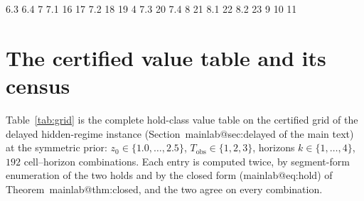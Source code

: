 \documentclass[11pt,a4paper]{article}
\makeatletter
\theoremstyle{plain}
\theoremstyle{definition}
\theoremstyle{remark}
\newcommand{\Tobs}{T_{\mathrm{obs}}}
\newcommand{\mref}[1]{\csname mainlab@#1\endcsname}
\newcommand{\meqref}[1]{(\mref{#1})}
\makeatother
\begin{document}
\expandafter\def\csname mainlab@ex:additive\endcsname{6.3}
\expandafter\def\csname mainlab@rem:delayedschedule\endcsname{6.4}
\expandafter\def\csname mainlab@sec:stochastic\endcsname{7}
\expandafter\def\csname mainlab@prop:pathdeficit\endcsname{7.1}
\expandafter\def\csname mainlab@eq:pathdeficit\endcsname{16}
\expandafter\def\csname mainlab@eq:sensor\endcsname{17}
\expandafter\def\csname mainlab@prop:noisyprobe\endcsname{7.2}
\expandafter\def\csname mainlab@eq:noisyprobe\endcsname{18}
\expandafter\def\csname mainlab@eq:majority3\endcsname{19}
\expandafter\def\csname mainlab@fig:probes\endcsname{4}
\expandafter\def\csname mainlab@prop:probecount\endcsname{7.3}
\expandafter\def\csname mainlab@eq:probecount\endcsname{20}
\expandafter\def\csname mainlab@rem:eps0\endcsname{7.4}
\expandafter\def\csname mainlab@sec:dr\endcsname{8}
\expandafter\def\csname mainlab@eq:rho\endcsname{21}
\expandafter\def\csname mainlab@prop:dr\endcsname{8.1}
\expandafter\def\csname mainlab@eq:contam\endcsname{22}
\expandafter\def\csname mainlab@prop:priorcontam\endcsname{8.2}
\expandafter\def\csname mainlab@eq:priorcontam\endcsname{23}
\expandafter\def\csname mainlab@sec:related\endcsname{9}
\expandafter\def\csname mainlab@sec:verification\endcsname{10}
\expandafter\def\csname mainlab@sec:discussion\endcsname{11}
\section{The certified value table and its census}\label{si:grid}

Table~\ref{tab:grid} is the complete hold-class value table on the certified grid of the delayed hidden-regime instance (Section~\mref{sec:delayed} of the main text) at the symmetric prior: $z_0\in\{1.0,\dots,2.5\}$, $\Tobs\in\{1,2,3\}$, horizons $k\in\{1,\dots,4\}$, $192$ cell--horizon combinations. Each entry is computed twice, by segment-form enumeration of the two holds and by the closed form \meqref{eq:hold} of Theorem~\mref{thm:closed}, and the two agree on every combination.
\end{document}
